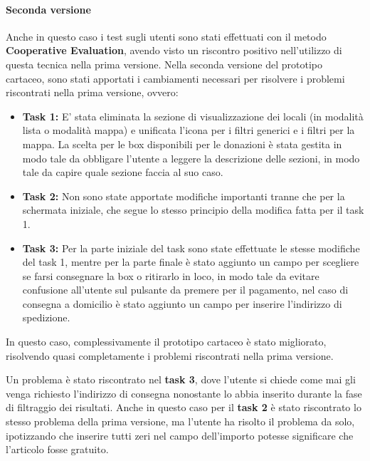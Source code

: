 \documentclass{article}
\begin{document}
\paragraph{Seconda versione}
\mbox{}
\newline
Anche in questo caso i test sugli utenti sono stati effettuati con il metodo \textbf{Cooperative Evaluation}, avendo visto un riscontro positivo nell'utilizzo di questa tecnica nella prima versione.
Nella seconda versione del prototipo cartaceo, sono stati apportati i cambiamenti necessari per risolvere i problemi riscontrati nella prima versione, ovvero:
\begin{itemize}
    \item \textbf{Task 1:} E' stata eliminata la sezione di visualizzazione dei locali (in modalità lista o modalità mappa) e unificata l'icona per i filtri generici e i filtri per la mappa. La scelta per le box disponibili per le donazioni è stata gestita in modo tale da obbligare l'utente a leggere la descrizione delle sezioni, in modo tale da capire quale sezione faccia al suo caso.
    \item \textbf{Task 2:} Non sono state apportate modifiche importanti tranne che per la schermata iniziale, che segue lo stesso principio della modifica fatta per il task 1. 
    \item \textbf{Task 3:} Per la parte iniziale del task sono state effettuate le stesse modifiche del task 1, mentre per la parte finale è stato aggiunto un campo per scegliere se farsi consegnare la box o ritirarlo in loco, in modo tale da evitare confusione all'utente sul pulsante da premere per il pagamento, nel caso di consegna a domicilio è stato aggiunto un campo per inserire l'indirizzo di spedizione.
\end{itemize}

In questo caso, complessivamente il prototipo cartaceo è stato migliorato, risolvendo quasi completamente i problemi riscontrati nella prima versione.

Un problema è stato riscontrato nel \textbf{task 3}, dove l'utente si chiede come mai gli venga richiesto l'indirizzo di consegna nonostante lo abbia inserito durante la fase di filtraggio dei risultati.
Anche in questo caso per il \textbf{task 2} è stato riscontrato lo stesso problema della prima versione, ma l'utente ha risolto il problema da solo, ipotizzando che inserire tutti zeri nel campo dell'importo potesse significare che l'articolo fosse gratuito.
\end{document}
